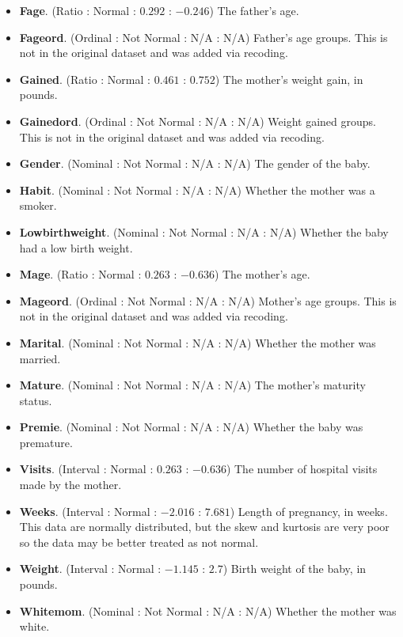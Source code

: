 \begin{itemize}
  \item \textbf{Fage}. (Ratio : Normal : $ 0.292 $ : $ -0.246 $) The father's age.
  \item \textbf{Fageord}. (Ordinal : Not Normal : N/A : N/A) Father's age groups. This is not in the original dataset and was added via recoding.
  \item \textbf{Gained}. (Ratio : Normal : $ 0.461 $ : $ 0.752 $) The mother's weight gain, in pounds.
  \item \textbf{Gainedord}. (Ordinal : Not Normal : N/A : N/A) Weight gained groups. This is not in the original dataset and was added via recoding.  
  \item \textbf{Gender}. (Nominal : Not Normal : N/A : N/A) The gender of the baby.
  \item \textbf{Habit}. (Nominal : Not Normal : N/A : N/A) Whether the mother was a smoker.
  \item \textbf{Lowbirthweight}. (Nominal : Not Normal : N/A : N/A) Whether the baby had a low birth weight.
  \item \textbf{Mage}. (Ratio : Normal : $ 0.263 $ : $ -0.636 $) The mother's age.
  \item \textbf{Mageord}. (Ordinal : Not Normal : N/A : N/A) Mother's age groups. This is not in the original dataset and was added via recoding.  
  \item \textbf{Marital}. (Nominal : Not Normal : N/A : N/A) Whether the mother was married.
  \item \textbf{Mature}. (Nominal : Not Normal : N/A : N/A) The mother's maturity status.
  \item \textbf{Premie}. (Nominal : Not Normal : N/A : N/A) Whether the baby was premature.
  \item \textbf{Visits}. (Interval : Normal : $ 0.263 $ : $ -0.636 $) The number of hospital visits made by the mother.
  \item \textbf{Weeks}. (Interval : Normal : $ -2.016 $ : $ 7.681 $) Length of pregnancy, in weeks. This data are normally distributed, but the skew and kurtosis are very poor so the data may be better treated as not normal.
  \item \textbf{Weight}. (Interval : Normal : $ -1.145 $ : $ 2.7 $) Birth weight of the baby, in pounds.
  \item \textbf{Whitemom}. (Nominal : Not Normal : N/A : N/A) Whether the mother was white.
\end{itemize}

